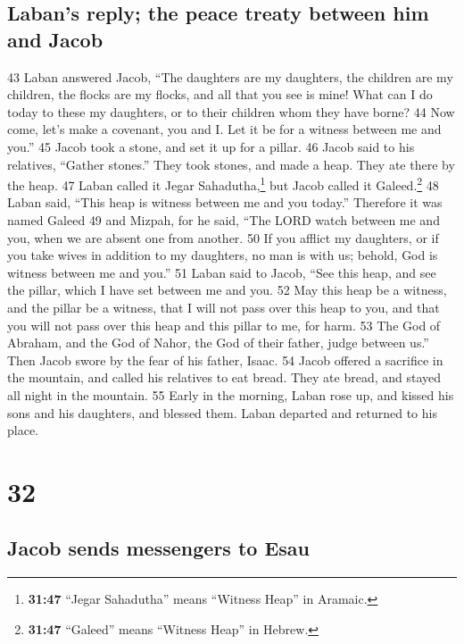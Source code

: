 \hypertarget{labans-reply-the-peace-treaty-between-him-and-jacob}{%
\subsection{Laban's reply; the peace treaty between him and
Jacob}\label{labans-reply-the-peace-treaty-between-him-and-jacob}}

{43} Laban answered Jacob, ``The daughters are my daughters, the
children are my children, the flocks are my flocks, and all that you see
is mine! What can I do today to these my daughters, or to their children
whom they have borne? {44} Now come, let's make a covenant, you and I.
Let it be for a witness between me and you.'' {45} Jacob took a stone,
and set it up for a pillar. {46} Jacob said to his relatives, ``Gather
stones.'' They took stones, and made a heap. They ate there by the heap.
{47} Laban called it Jegar Sahadutha,\footnote{\textbf{31:47} ``Jegar
  Sahadutha'' means ``Witness Heap'' in Aramaic.} but Jacob called it
Galeed.\footnote{\textbf{31:47} ``Galeed'' means ``Witness Heap'' in
  Hebrew.} {48} Laban said, ``This heap is witness between me and you
today.'' Therefore it was named Galeed {49} and Mizpah, for he said,
``The LORD watch between me and you, when we are absent one from
another. {50} If you afflict my daughters, or if you take wives in
addition to my daughters, no man is with us; behold, God is witness
between me and you.'' {51} Laban said to Jacob, ``See this heap, and see
the pillar, which I have set between me and you. {52} May this heap be a
witness, and the pillar be a witness, that I will not pass over this
heap to you, and that you will not pass over this heap and this pillar
to me, for harm. {53} The God of Abraham, and the God of Nahor, the God
of their father, judge between us.'' Then Jacob swore by the fear of his
father, Isaac. {54} Jacob offered a sacrifice in the mountain, and
called his relatives to eat bread. They ate bread, and stayed all night
in the mountain. {55} Early in the morning, Laban rose up, and kissed
his sons and his daughters, and blessed them. Laban departed and
returned to his place.

\hypertarget{section-31}{%
\section{32}\label{section-31}}

\hypertarget{jacob-sends-messengers-to-esau}{%
\subsection{Jacob sends messengers to
Esau}\label{jacob-sends-messengers-to-esau}}

